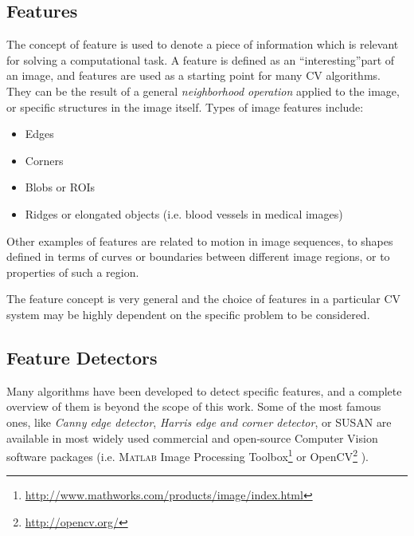 \vspace{0.5cm}


\subsection{Features}

The concept of feature is used to denote a piece of information which is relevant for solving a computational task\cite{featExtractionAndImageProcessingBook}.
A feature is defined as an \textquotedblleft{interesting}\textquotedblright part of an image, and features are used as a starting point for many \Gls{CV} algorithms.
They can be the result of a general \textit{neighborhood operation}\cite{jahne2000computer} applied to the image, or specific structures in the image itself.
Types of image features include:
\begin{itemize}
 \item Edges
 \item Corners
 \item Blobs or \Glspl{ROI}
 \item Ridges or elongated objects (i.e. blood vessels in medical images)
\end{itemize}

Other examples of features are related to motion in image sequences, to shapes defined in terms
of curves or boundaries between different image regions, or to properties of such a region\cite{MVG_Hartley2004}.

The feature concept is very general and the choice of features in a particular \Gls{CV} system may be highly dependent on the specific problem to be considered.\\


\subsection{Feature Detectors}

Many algorithms have been developed to detect specific features, and a complete overview of them is beyond
the scope of this work. Some of the most famous ones, like \textit{Canny edge detector}\cite{canny},
\textit{Harris edge and corner detector}, or SUSAN \cite{detectSusan} are available in most widely used
commercial and open-source Computer Vision software packages (i.e. {\scshape Matlab}
Image Processing Toolbox\footnote{\url{http://www.mathworks.com/products/image/index.html}} or OpenCV\footnote{\url{http://opencv.org/}} ).\\

